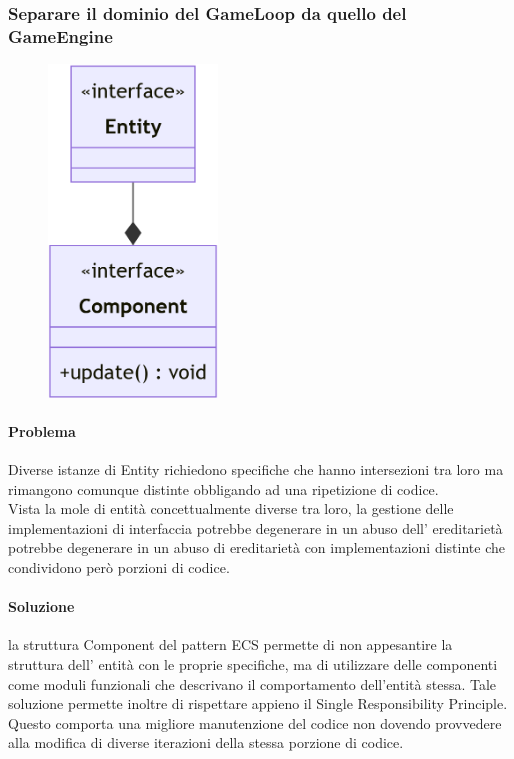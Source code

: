\documentclass[a4paper,12pt]{report}
\begin{document}
\subsubsection*{Separare il dominio del GameLoop da quello del GameEngine}
%
\begin{figure}[H]
    \centering{}
    \includegraphics[width=0.4\textwidth]{img/UMLEntita.png}
    \caption{}
\end{figure}
%
\paragraph*{Problema} Diverse istanze di Entity richiedono specifiche che hanno intersezioni tra loro ma rimangono comunque distinte obbligando ad una ripetizione di codice.
\\
Vista la mole di entità concettualmente diverse tra loro, la gestione delle implementazioni di interfaccia potrebbe degenerare in un abuso dell’ ereditarietà potrebbe degenerare in un abuso di ereditarietà con implementazioni distinte che condividono però porzioni di codice.
%
\paragraph*{Soluzione} la struttura Component del pattern ECS permette di non appesantire la struttura dell’ entità con le proprie specifiche, ma di utilizzare delle componenti come moduli funzionali che descrivano il comportamento dell’entità stessa.
Tale soluzione permette inoltre di rispettare appieno il Single Responsibility Principle. Questo comporta una migliore manutenzione del codice non dovendo provvedere alla modifica di diverse iterazioni della stessa porzione di codice.
\end{document}
